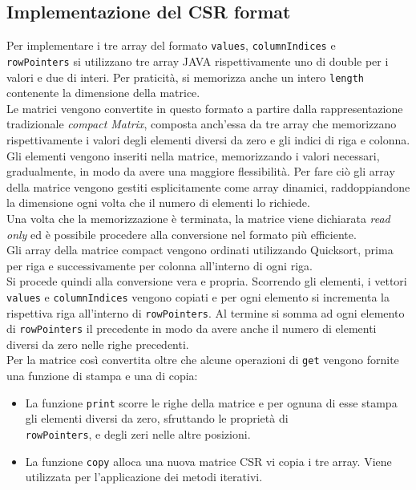 \documentclass[12pt]{article}
\begin{document}
\subsection{Implementazione del CSR format}
Per implementare i tre array del formato \texttt{values}, \texttt{columnIndices} e\\\texttt{rowPointers} si utilizzano tre array JAVA rispettivamente uno di double per i valori e due di interi. Per praticità, si memorizza anche un intero \texttt{length} contenente la dimensione della matrice.\\
Le matrici vengono convertite in questo formato a partire dalla rappresentazione tradizionale \textit{compact Matrix}, composta anch'essa da tre array che memorizzano rispettivamente i valori degli elementi diversi da zero e gli indici di riga e colonna.\\Gli elementi vengono inseriti nella matrice, memorizzando i valori necessari, gradualmente, in modo da avere una maggiore flessibilità. Per fare ciò gli array della matrice vengono gestiti esplicitamente come array dinamici, raddoppiandone la dimensione ogni volta che il numero di elementi lo richiede.\\ 
Una volta che la memorizzazione è terminata, la matrice viene dichiarata \textit{read only} ed è possibile procedere alla conversione nel formato più efficiente.\\
Gli array della matrice compact vengono ordinati utilizzando Quicksort, prima per riga e successivamente per colonna all'interno di ogni riga. \\Si procede quindi alla conversione vera e propria. Scorrendo gli elementi, i vettori \texttt{values} e \texttt{columnIndices} vengono copiati e per ogni elemento si incrementa la rispettiva riga all'interno di \texttt{rowPointers}. Al termine si somma ad ogni elemento di \texttt{rowPointers} il precedente in modo da avere anche il numero di elementi diversi da zero nelle righe precedenti.\\
Per la matrice così convertita oltre che alcune operazioni di \texttt{get} vengono fornite una funzione di stampa e una di copia:
\begin{itemize}
    \item La funzione \texttt{print} scorre le righe della matrice e per ognuna di esse stampa gli elementi diversi da zero, sfruttando le proprietà di \\\texttt{rowPointers}, e degli zeri nelle altre posizioni.
    \item La funzione \texttt{copy} alloca una nuova matrice CSR vi copia i tre array. Viene utilizzata per l'applicazione dei metodi iterativi.
\end{itemize}
\end{document}
